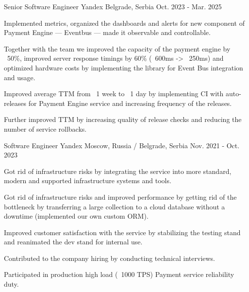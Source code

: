 

\begin{cventries}

  \cventry
    {Senior Software Engineer} %
    {Yandex} %
    {Belgrade, Serbia} %
    {Oct. 2023 - Mar. 2025} %
    {
      \begin{cvitems} %
        \item {Implemented metrics, organized the dashboards and alerts for new component of Payment Engine — Eventbus — made it observable and controllable.}
        \item {Together with the team we improved the capacity of the payment engine by ~50\%, improved server response timings by 60\% (~600ms -> ~250ms) and optimized hardware costs by implementing the library for Event Bus integration and usage.}
        \item {Improved average TTM from ~1 week to ~1 day by implementing CI with auto-releases for Payment Engine service and increasing frequency of the releases.}
        \item {Further improved TTM by increasing quality of release checks and reducing the number of service rollbacks.}
      \end{cvitems}
    }
  \cventry
    {Software Engineer} %
    {Yandex} %
    {Moscow, Russia / Belgrade, Serbia} %
    {Nov. 2021 - Oct. 2023} %
    {
      \begin{cvitems} %
        \item {Got rid of infrastructure risks by integrating the service into more standard, modern and supported infrastructure systems and tools.}
        \item {Got rid of infrastructure risks and improved performance by getting rid of the bottleneck by transferring a large collection to a cloud database without a downtime (implemented our own custom ORM).}
        \item {Improved customer satisfaction with the service by stabilizing the testing stand and reanimated the dev stand for internal use.}
        \item {Contributed to the company hiring by conducting technical interviews.}
        \item {Participated in production high load (~1000 TPS) Payment service reliability duty.}
      \end{cvitems}
}


\end{cventries}
